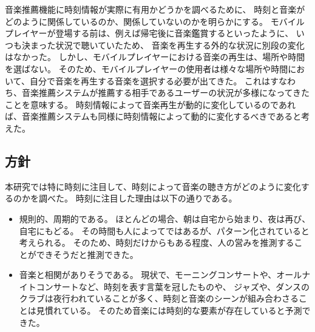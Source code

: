 \documentclass[11pt, onecolumn]{jsarticle}
\begin{document}

音楽推薦機能に時刻情報が実際に有用かどうかを調べるために、
時刻と音楽がどのように関係しているのか、関係していないのかを明らかにする。
モバイルプレイヤーが登場する前は、例えば帰宅後に音楽鑑賞するといったように、
いつも決まった状況で聴いていたため、
音楽を再生する外的な状況に別段の変化はなかった。
しかし、モバイルプレイヤーにおける音楽の再生は、場所や時間を選ばない。
そのため、モバイルプレイヤーの使用者は様々な場所や時間において、自分で音楽を再生する音楽を選択する必要が出てきた。
これはすなわち、音楽推薦システムが推薦する相手であるユーザーの状況が多様になってきたことを意味する。
時刻情報によって音楽再生が動的に変化しているのであれば、音楽推薦システムも同様に時刻情報によって動的に変化するべきであると考えた。


\subsection{方針}
本研究では特に時刻に注目して、時刻によって音楽の聴き方がどのように変化するのかを調べた。
時刻に注目した理由は以下の通りである。
\begin{itemize}
\item
規則的、周期的である。
ほとんどの場合、朝は自宅から始まり、夜は再び、自宅にもどる。
その時間も人によってではあるが、パターン化されていると考えられる。
そのため、時刻だけからもある程度、人の営みを推測することができそうだと推測できた。
\item
音楽と相関がありそうである。
現状で、モーニングコンサートや、オールナイトコンサートなど、時刻を表す言葉を冠したものや、
ジャズや、ダンスのクラブは夜行われていることが多く、時刻と音楽のシーンが組み合わさることは見慣れている。
そのため音楽には時刻的な要素が存在していると予測できた。


\end{itemize}

\end{document}
